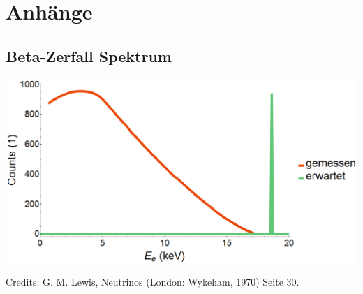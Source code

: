 \documentclass{artifacts/bll}
\begin{document}
    
    \setlength{\parindent}{0em}

    \maketitle
    \begin{doublespace}
      
    \vfill  
    \pagebreak        
    
    \vfill     
    \end{doublespace} 
	\pagebreak
    
    \inhaltverzeichnis 
    
    \begin{doublespace}
        
    \vfill  
    \pagebreak   
     
        
    \vfill  
    \pagebreak     
        
    \vfill  
    \pagebreak      
     
       
    \vfill  
    \pagebreak  
    \end{doublespace}    
    
    
    

    \appendix
    \chapter{Anhänge}

    

    \section{Beta-Zerfall Spektrum}
    \label{fig:b-zerfall}
    \begin{center}
        \includegraphics[width=1\textwidth]{appendix/Tritiumzerfall-elektronenergiespektrum}
    \end{center}
    Credits: G. M. Lewis, Neutrinos (London: Wykeham, 1970) Seite 30.
\end{document}
